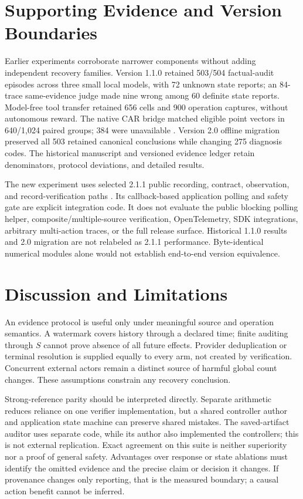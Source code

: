 \documentclass[conference]{IEEEtran}
\begin{document}
\section{Supporting Evidence and Version Boundaries}

Earlier experiments corroborate narrower components without adding independent recovery families. Version 1.1.0 retained 503/504 factual-audit episodes across three small local models, with 72 unknown state reports; an 84-trace same-evidence judge made nine wrong among 60 definite state reports. Model-free tool transfer retained 656 cells and 900 operation captures, without autonomous reward. The native CAR bridge matched eligible point vectors in 640/1,024 paired groups; 384 were unavailable \cite{experimentartifact,carcode}. Version 2.0 offline migration preserved all 503 retained canonical conclusions while changing 275 diagnosis codes. The historical manuscript and versioned evidence ledger retain denominators, protocol deviations, and detailed results.

The new experiment uses selected 2.1.1 public recording, contract, observation, and record-verification paths \cite{artifact}. Its callback-based application polling and safety gate are explicit integration code. It does not evaluate the public blocking polling helper, composite/multiple-source verification, OpenTelemetry, SDK integrations, arbitrary multi-action traces, or the full release surface. Historical 1.1.0 results and 2.0 migration are not relabeled as 2.1.1 performance. Byte-identical numerical modules alone would not establish end-to-end version equivalence.

\section{Discussion and Limitations}

An evidence protocol is useful only under meaningful source and operation semantics. A watermark covers history through a declared time; finite auditing through $S$ cannot prove absence of all future effects. Provider deduplication or terminal resolution is supplied equally to every arm, not created by verification. Concurrent external actors remain a distinct source of harmful global count changes. These assumptions constrain any recovery conclusion.

Strong-reference parity should be interpreted directly. Separate arithmetic reduces reliance on one verifier implementation, but a shared controller author and application state machine can preserve shared mistakes. The saved-artifact auditor uses separate code, while its author also implemented the controllers; this is not external replication. Exact agreement on this suite is neither superiority nor a proof of general safety. Advantages over response or state ablations must identify the omitted evidence and the precise claim or decision it changes. If provenance changes only reporting, that is the measured boundary; a causal action benefit cannot be inferred.
\end{document}
